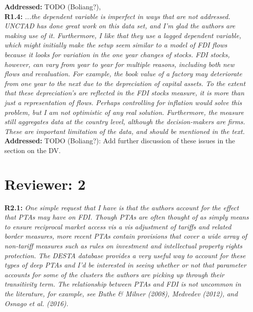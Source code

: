 \documentclass[a4paper,11pt]{texMemo}
\begin{document}
\noindent \textbf{Addressed:} TODO (Boliang?),  \\


\noindent \textbf{R1.4:} \emph{...the dependent variable is imperfect in ways that are not addressed. UNCTAD has done great work on this data set, and I'm glad the authors are making use of it. Furthermore, I like that they use a lagged dependent variable, which might initially make the setup seem similar to a model of FDI flows because it looks for variation in the one year changes of stocks. FDI stocks, however, can vary from year to year for multiple reasons, including both new flows and revaluation. For example, the book value of a factory may deteriorate from one year to the next due to the depreciation of capital assets. To the extent that these depreciation's are reflected in the FDI stocks measure, it is more than just a representation of flows. Perhaps controlling for inflation would solve this problem, but I am not optimistic of any real solution. Furthermore, the measure still aggregates data at the country level, although the decision-makers are firms. These are important limitation of the data, and should be mentioned in the text.}\\

\noindent \textbf{Addressed:} TODO (Boliang?): Add further discussion of these issues in the section on the DV. \\

\section*{Reviewer: 2}


\noindent \textbf{R2.1:} \emph{One simple request that I have is that the authors account for the effect that PTAs may have on FDI. Though PTAs are often thought of as simply means to ensure reciprocal market access vis a vis adjustment of tariffs and related border measures, more recent PTAs contain provisions that cover a wide array of non-tariff measures such as rules on investment and intellectual property rights protection. The DESTA database provides a very useful way to account for these types of deep PTAs and I'd be interested in seeing whether or not that parameter accounts for some of the clusters the authors are picking up through their transitivity term. The relationship between PTAs and FDI is not uncommon in the literature, for example, see Buthe \& Milner (2008), Medvedev (2012), and Osnago et al. (2016).}\\
\end{document}

